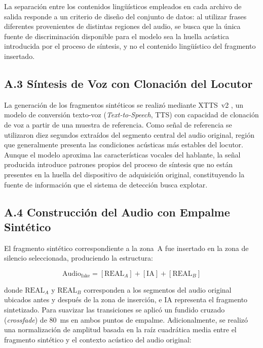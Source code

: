 La separación entre los contenidos lingüísticos empleados en cada archivo de salida
responde a un criterio de diseño del conjunto de datos: al utilizar frases diferentes
provenientes de distintas regiones del audio, se busca que la única fuente de
discriminación disponible para el modelo sea la huella acústica introducida por el
proceso de síntesis, y no el contenido lingüístico del fragmento insertado.

\subsection*{A.3 Síntesis de Voz con Clonación del Locutor}

La generación de los fragmentos sintéticos se realizó mediante XTTS~v2
\cite{xtts_v2}, un modelo de conversión texto-voz (\textit{Text-to-Speech}, TTS) con
capacidad de clonación de voz a partir de una muestra de referencia. Como señal de
referencia se utilizaron diez segundos extraídos del segmento central del audio
original, región que generalmente presenta las condiciones acústicas más estables del
locutor. Aunque el modelo aproxima las características vocales del hablante, la señal
producida introduce patrones propios del proceso de síntesis que no están presentes en
la huella del dispositivo de adquisición original, constituyendo la fuente de información
que el sistema de detección busca explotar.

\subsection*{A.4 Construcción del Audio con Empalme Sintético}

El fragmento sintético correspondiente a la zona~A fue insertado en la zona de silencio
seleccionada, produciendo la estructura:

\begin{equation}
    \text{Audio}_{\text{fake}} = [\text{REAL}_A] + [\text{IA}] + [\text{REAL}_B]
    \label{eq:estructura}
\end{equation}

donde $\text{REAL}_A$ y $\text{REAL}_B$ corresponden a los segmentos del audio
original ubicados antes y después de la zona de inserción, e $\text{IA}$ representa el
fragmento sintetizado. Para suavizar las transiciones se aplicó un fundido cruzado
(\textit{crossfade}) de 80~ms en ambos puntos de empalme. Adicionalmente, se
realizó una normalización de amplitud basada en la raíz cuadrática media entre el
fragmento sintético y el contexto acústico del audio original:

